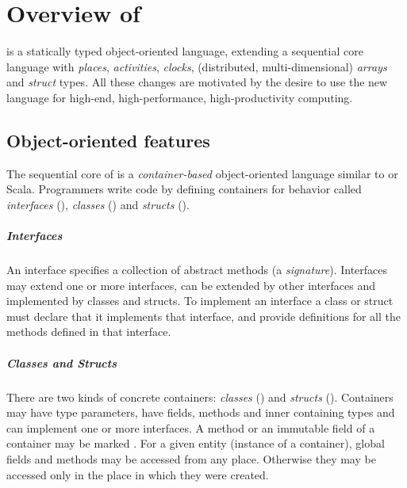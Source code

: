 \chapter{Overview of \Xten}

\Xten{} is a statically typed object-oriented language, extending a
sequential core language with
\emph{places}, \emph{activities}, \emph{clocks},
(distributed, multi-dimensional) \emph{arrays} and \emph{struct}
types. All these changes are motivated by the desire to use the new
language for high-end, high-performance, high-productivity computing.

\section{Object-oriented features}

The sequential core of \Xten{} is a {\em container-based} object-oriented language
similar to \java{} or Scala.
Programmers write \Xten{} code by defining containers for behavior called
\emph{interfaces}
(),
\emph{classes}
() and
\emph{structs}
().


\paragraph{Interfaces}

An \Xten{} interface specifies a collection of abstract methods (a
{\em signature}). Interfaces may extend one or more interfaces, can be
extended by other interfaces and implemented by classes and structs.
To implement an interface a class or struct must declare that it
implements that interface, and provide definitions for all the methods
defined in that interface.

\paragraph{Classes and Structs}

There are two kinds of concrete containers: \emph{classes}
() and \emph{structs}
(). Containers may have type parameters, have fields,
methods and inner containing types and can implement one or more
interfaces. A method or an immutable field of a
container may be marked .  For a given entity (instance of
a container), global fields and methods may be accessed from any
place. Otherwise they may be accessed only in the place in which they
were created.


